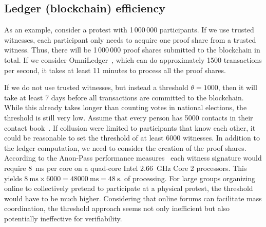 \subsection{Ledger (blockchain) efficiency}
As an example, consider a protest with 1\,000\,000 participants.
If we use trusted witnesses, each participant only needs to acquire one proof share from a trusted witness.
Thus, there will be 1\,000\,000 proof shares submitted to the blockchain in total.
If we consider OmniLedger~\cite{OmniLedger}, which can do approximately 1500 transactions per second, it takes at least 11 minutes to process all the proof shares.

If we do not use trusted witnesses, but instead a threshold \(\theta = 1000\), then it will take at least 7 days before all transactions are committed to the blockchain. 
While this already takes longer than counting votes in national elections, the threshold is still very low. 
Assume that every person has 5000 contacts in their contact book~\cite{DifficultyOfPrivateContactDiscovery}.
If collusion were limited to participants that know each other, it could be reasonable to set the threshold of at least 6000 witnesses. 
In addition to the ledger computation, we need to consider the creation of the proof shares. 
According to the Anon-Pass performance measures~\cite{AnonPass} each witness signature would require \SI{8}{\milli\second} per core on a quad-core Intel \SI{2.66}{\giga\hertz} Core 2 processors.
This yields \(
  \SI{8}{\milli\second}\times 6000 = \SI{48000}{\milli\second} = 
  \SI{48}{\second}.
\) of processing. 
For large groups organizing online to collectively pretend to participate at a physical protest, the threshold would have to be much higher. 
Considering that online forums can facilitate mass coordination, the threshold approach seems not only inefficient but also potentially ineffective for verifiability.



